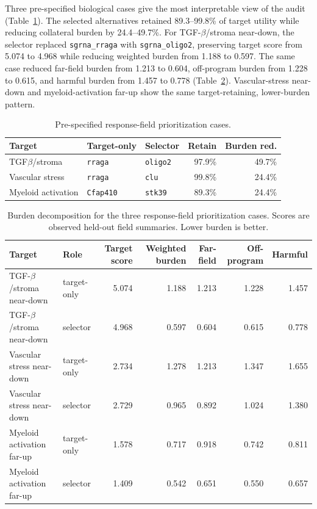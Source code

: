 \documentclass[sigconf,review,balance=false]{acmart}
\begin{document}
Three pre-specified biological cases give the most interpretable view of the audit (Table~\ref{tab:app_selector_cases}). The selected alternatives retained 89.3--99.8\% of target utility while reducing collateral burden by 24.4--49.7\%. For TGF-$\beta$/stroma near-down, the selector replaced \texttt{sgrna\_rraga} with \texttt{sgrna\_oligo2}, preserving target score from 5.074 to 4.968 while reducing weighted burden from 1.188 to 0.597. The same case reduced far-field burden from 1.213 to 0.604, off-program burden from 1.228 to 0.615, and harmful burden from 1.457 to 0.778 (Table~\ref{tab:app_selector_burden_decomposition}). Vascular-stress near-down and myeloid-activation far-up show the same target-retaining, lower-burden pattern.

\begin{table}[t]
\centering
\scriptsize
\caption{Pre-specified response-field prioritization cases.}
\label{tab:app_selector_cases}
\setlength{\tabcolsep}{3pt}
\begin{tabular}{@{}lllrr@{}}
\toprule
Target & Target-only & Selector & Retain & Burden red. \\
\midrule
TGF$\beta$/stroma & \texttt{rraga} & \texttt{oligo2} & 97.9\% & 49.7\% \\
Vascular stress & \texttt{rraga} & \texttt{clu} & 99.8\% & 24.4\% \\
Myeloid activation & \texttt{Cfap410} & \texttt{stk39} & 89.3\% & 24.4\% \\
\bottomrule
\end{tabular}
\end{table}

\begin{table}[t]
\centering
\small
\caption{Burden decomposition for the three response-field prioritization cases. Scores are observed held-out field summaries. Lower burden is better.}
\label{tab:app_selector_burden_decomposition}
\begin{tabular}{llrrrrr}
\toprule
Target & Role & Target score & Weighted burden & Far-field & Off-program & Harmful \\
\midrule
TGF-$\beta$/stroma near-down & target-only & 5.074 & 1.188 & 1.213 & 1.228 & 1.457 \\
TGF-$\beta$/stroma near-down & selector & 4.968 & 0.597 & 0.604 & 0.615 & 0.778 \\
Vascular stress near-down & target-only & 2.734 & 1.278 & 1.213 & 1.347 & 1.655 \\
Vascular stress near-down & selector & 2.729 & 0.965 & 0.892 & 1.024 & 1.380 \\
Myeloid activation far-up & target-only & 1.578 & 0.717 & 0.918 & 0.742 & 0.811 \\
Myeloid activation far-up & selector & 1.409 & 0.542 & 0.651 & 0.550 & 0.657 \\
\bottomrule
\end{tabular}
\end{table}
\end{document}
